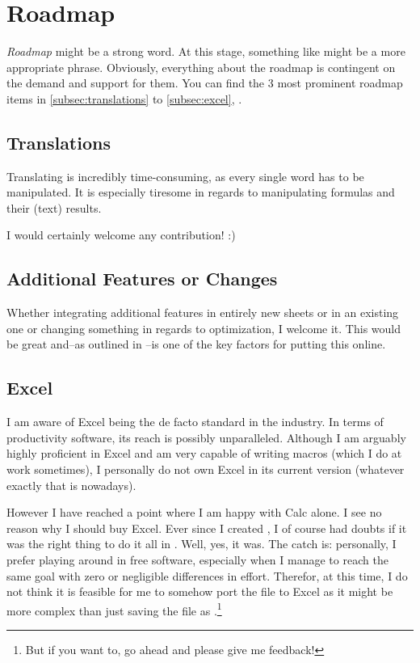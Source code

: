 \section{Roadmap}
\label{sec:roadmap}

\emph{Roadmap} might be a strong word.
At this stage, something like  might be a more appropriate phrase.
Obviously, everything about the roadmap is contingent on the demand and support for them.
You can find the 3 most prominent roadmap items in \autoref{subsec:translations} to \autoref{subsec:excel}, .

\subsection{Translations}
\label{subsec:translations}

Translating \tfn is incredibly time-consuming, as every single word has to be manipulated.
It is especially tiresome in regards to manipulating formulas and their (text) results.

I would certainly welcome any contribution! :)

\subsection{Additional Features or Changes}
\label{subsec:additional-features}

Whether integrating additional features in entirely new sheets or in an existing one or changing something in regards to optimization, I welcome it.
This would be great and--as outlined in --is one of the key factors for putting this online.

\subsection{Excel}
\label{subsec:excel}

I am aware of Excel being the de facto standard in the industry.
In terms of productivity software, its reach is possibly unparalleled.
Although I am arguably highly proficient in Excel and am very capable of writing macros (which I do at work sometimes), I personally do not own Excel in its current version (whatever exactly that is nowadays).

However I have reached a point where I am happy with Calc alone.
I see no reason why I should buy Excel.
Ever since I created \tfn, I of course had doubts if it was the right thing to do it all in \loc.
Well, yes, it was.
The catch is: personally, I prefer playing around in free software, especially when I manage to reach the same goal with zero or negligible differences in effort.
Therefor, at this time, I do not think it is feasible for me to somehow port the file to Excel as it might be more complex than just saving the file as .\footnote{But if you want to, go ahead and please give me feedback!}

